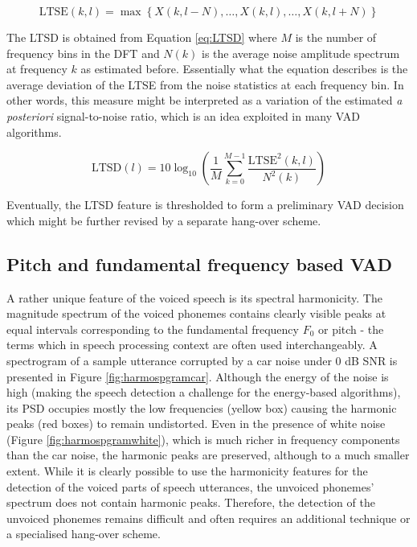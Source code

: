 \begin{equation}
\text{LTSE}(k,l) = \max \left \{ X(k,l-N),\ldots,X(k,l),\ldots,X(k,l+N) \right \}
\label{eq:LTSE}
\end{equation}

The LTSD is obtained from Equation \ref{eq:LTSD} where $M$ is the number of frequency bins in the DFT and $N(k)$ is the average noise amplitude spectrum at frequency $k$ as estimated before. Essentially what the equation describes is the average deviation of the LTSE from the noise statistics at each frequency bin. In other words, this measure might be interpreted as a variation of the estimated \emph{a posteriori} signal-to-noise ratio, which is an idea exploited in many VAD algorithms.

\begin{equation}
\text{LTSD}(l) = 10 \log_{10} \left ( \frac{1}{M} \sum_{k=0}^{M-1} \frac{\text{LTSE}^{2}(k,l)}{N^{2}(k)} \right )
\label{eq:LTSD}
\end{equation}

Eventually, the LTSD feature is thresholded to form a preliminary VAD decision which might be further revised by a separate hang-over scheme.

\subsection{Pitch and fundamental frequency based VAD}

A rather unique feature of the voiced speech is its spectral harmonicity. The magnitude spectrum of the voiced phonemes contains clearly visible peaks at equal intervals corresponding to the fundamental frequency $F_0$ or pitch - the terms which in speech processing context are often used interchangeably. A spectrogram of a sample utterance corrupted by a car noise under 0 dB SNR is presented in Figure \ref{fig:harmospgramcar}. Although the energy of the noise is high (making the speech detection a challenge for the energy-based algorithms), its PSD occupies mostly the low frequencies (yellow box) causing the harmonic peaks (red boxes) to remain undistorted. Even in the presence of white noise (Figure \ref{fig:harmospgramwhite}), which is much richer in frequency components than the car noise, the harmonic peaks are preserved, although to a much smaller extent. While it is clearly possible to use the harmonicity features for the detection of the voiced parts of speech utterances, the unvoiced phonemes' spectrum does not contain harmonic peaks. Therefore, the detection of the unvoiced phonemes remains difficult and often requires an additional technique or a specialised hang-over scheme.

